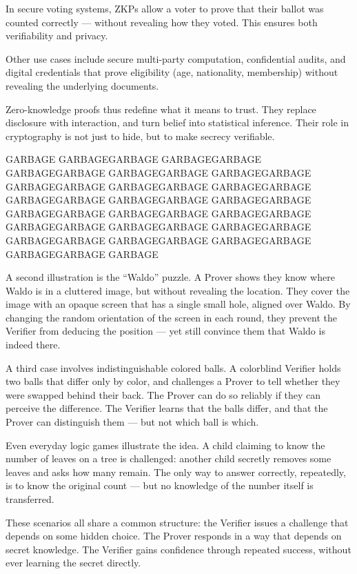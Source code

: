In secure voting systems, ZKPs allow a voter to prove that their ballot was counted correctly — without revealing how they voted. This ensures both verifiability and privacy.

Other use cases include secure multi-party computation, confidential audits, and digital credentials that prove eligibility (age, nationality, membership) without revealing the underlying documents.

Zero-knowledge proofs thus redefine what it means to trust. They replace disclosure with interaction, and turn belief into statistical inference. Their role in cryptography is not just to hide, but to make secrecy verifiable.


GARBAGE GARBAGEGARBAGE GARBAGEGARBAGE GARBAGEGARBAGE GARBAGEGARBAGE GARBAGEGARBAGE GARBAGEGARBAGE GARBAGEGARBAGE GARBAGEGARBAGE GARBAGEGARBAGE GARBAGEGARBAGE GARBAGEGARBAGE GARBAGEGARBAGE GARBAGEGARBAGE GARBAGEGARBAGE GARBAGEGARBAGE GARBAGEGARBAGE GARBAGEGARBAGE GARBAGEGARBAGE GARBAGEGARBAGE GARBAGEGARBAGE GARBAGEGARBAGE GARBAGE


A second illustration is the “Waldo” puzzle. A Prover shows they know where Waldo is in a cluttered image, but without revealing the location. They cover the image with an opaque screen that has a single small hole, aligned over Waldo. By changing the random orientation of the screen in each round, they prevent the Verifier from deducing the position — yet still convince them that Waldo is indeed there.

A third case involves indistinguishable colored balls. A colorblind Verifier holds two balls that differ only by color, and challenges a Prover to tell whether they were swapped behind their back. The Prover can do so reliably if they can perceive the difference. The Verifier learns that the balls differ, and that the Prover can distinguish them — but not which ball is which.

Even everyday logic games illustrate the idea. A child claiming to know the number of leaves on a tree is challenged: another child secretly removes some leaves and asks how many remain. The only way to answer correctly, repeatedly, is to know the original count — but no knowledge of the number itself is transferred.

These scenarios all share a common structure: the Verifier issues a challenge that depends on some hidden choice. The Prover responds in a way that depends on secret knowledge. The Verifier gains confidence through repeated success, without ever learning the secret directly.

